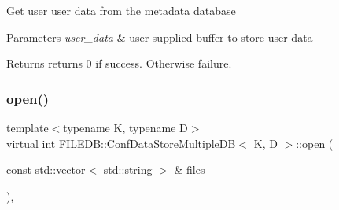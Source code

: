 Get user user data from the metadata database


\begin{DoxyParams}{Parameters}
{\em user\+\_\+data} & user supplied buffer to store user data \\
\hline
\end{DoxyParams}
\begin{DoxyReturn}{Returns}
returns 0 if success. Otherwise failure. 
\end{DoxyReturn}
\mbox{\label{classFILEDB_1_1ConfDataStoreMultipleDB_a3370c2f938d91e2352815aa45637b46d}} 
\subsubsection{\texorpdfstring{open()}{open()}\hspace{0.1cm}{\footnotesize\ttfamily [1/3]}}
{\footnotesize\ttfamily template$<$typename K, typename D$>$ \\
virtual int \mbox{\hyperlink{classFILEDB_1_1ConfDataStoreMultipleDB}{F\+I\+L\+E\+D\+B\+::\+Conf\+Data\+Store\+Multiple\+DB}}$<$ K, D $>$\+::open (\begin{DoxyParamCaption}\item[{const std\+::vector$<$ std\+::string $>$ \&}]{files }\end{DoxyParamCaption})\hspace{0.3cm}{\ttfamily [inline]}, {\ttfamily [virtual]}}

